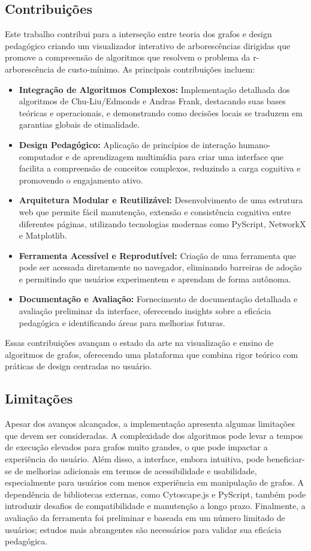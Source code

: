 \documentclass[12pt,a4paper]{article}
\begin{document}
\subsection{Contribuições}
Este trabalho contribui para a interseção entre teoria dos grafos e design pedagógico criando um visualizador interativo de arborescências dirigidas que promove a compreensão de algoritmos que resolvem o problema da r-arborescência de custo-mínimo. As principais contribuições incluem:
\begin{itemize}
    \item \textbf{Integração de Algoritmos Complexos:} Implementação detalhada dos algoritmos de Chu-Liu/Edmonds e Andras Frank, destacando suas bases teóricas e operacionais, e demonstrando como decisões locais se traduzem em garantias globais de otimalidade.
    \item \textbf{Design Pedagógico:} Aplicação de princípios de interação humano-computador e de aprendizagem multimídia para criar uma interface que facilita a compreensão de conceitos complexos, reduzindo a carga cognitiva e promovendo o engajamento ativo.
    \item \textbf{Arquitetura Modular e Reutilizável:} Desenvolvimento de uma estrutura web que permite fácil manutenção, extensão e consistência cognitiva entre diferentes páginas, utilizando tecnologias modernas como PyScript, NetworkX e Matplotlib.
    \item \textbf{Ferramenta Acessível e Reprodutível:} Criação de uma ferramenta que pode ser acessada diretamente no navegador, eliminando barreiras de adoção e permitindo que usuários experimentem e aprendam de forma autônoma.
    \item \textbf{Documentação e Avaliação:} Fornecimento de documentação detalhada e avaliação preliminar da interface, oferecendo insights sobre a eficácia pedagógica e identificando áreas para melhorias futuras.
\end{itemize}
Essas contribuições avançam o estado da arte na visualização e ensino de algoritmos de grafos, oferecendo uma plataforma que combina rigor teórico com práticas de design centradas no usuário.

\subsection{Limitações}
Apesar dos avanços alcançados, a implementação apresenta algumas limitações que devem ser consideradas. A complexidade dos algoritmos pode levar a tempos de execução elevados para grafos muito grandes, o que pode impactar a experiência do usuário. Além disso, a interface, embora intuitiva, pode beneficiar-se de melhorias adicionais em termos de acessibilidade e usabilidade, especialmente para usuários com menos experiência em manipulação de grafos. A dependência de bibliotecas externas, como Cytoscape.js e PyScript, também pode introduzir desafios de compatibilidade e manutenção a longo prazo. Finalmente, a avaliação da ferramenta foi preliminar e baseada em um número limitado de usuários; estudos mais abrangentes são necessários para validar sua eficácia pedagógica.   
\end{document}

